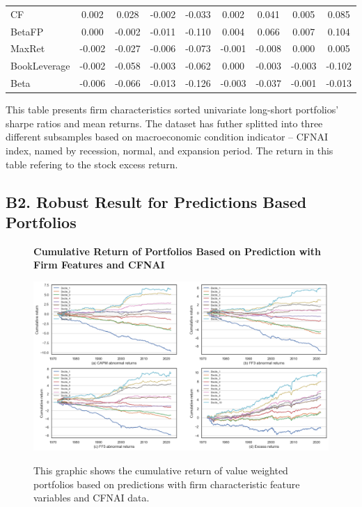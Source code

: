 \begin{table}[H]
\begin{tabular}{lcc|cc|cc|cc}
      CF & 0.002 & 0.028 & -0.002 & -0.033 & 0.002 & 0.041 & 0.005 & 0.085 \\ 
      BetaFP & 0.000 & -0.002 & -0.011 & -0.110 & 0.004 & 0.066 & 0.007 & 0.104 \\ 
      MaxRet & -0.002 & -0.027 & -0.006 & -0.073 & -0.001 & -0.008 & 0.000 & 0.005 \\ 
      BookLeverage & -0.002 & -0.058 & -0.003 & -0.062 & 0.000 & -0.003 & -0.003 & -0.102 \\ 
      Beta & -0.006 & -0.066 & -0.013 & -0.126 & -0.003 & -0.037 & -0.001 & -0.013 \\ \hline
  \end{tabular}
  \begin{tablenotes}
    \footnotesize
    \item This table presents firm characteristics sorted univariate long-short portfolios' sharpe ratios and mean returns. The dataset has futher splitted into three different subsamples based on macroeconomic condition indicator -- CFNAI index, named by recession, normal, and expansion period. The return in this table refering to the stock excess return.
  \end{tablenotes}
\end{table}

\subsection*{B2. Robust Result for Predictions Based Portfolios}\label{sec:appendixb2}

\begin{figure}[H]
  \centering
  \caption{\textbf{Cumulative Return of Portfolios Based on Prediction with Firm Features and CFNAI}}
  \includegraphics[width=.8\textwidth]{images/vw_portfolios_cumulative_return_cfnai.png}
  \label{fig: portfolios cum return firm features and cfnai}
  \caption*{\footnotesize{This graphic shows the cumulative return of value weighted portfolios based on predictions with firm characteristic feature variables and CFNAI data.}}
\end{figure}

